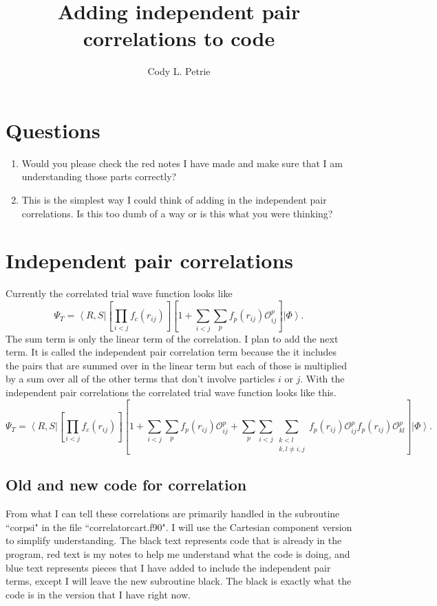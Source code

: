 \documentclass[12pt]{extarticle}
\title{Adding independent pair correlations to code}
\author{Cody L. Petrie}
\newcommand{\Oijp}{\mathcal{O}^p_{ij}}
\newcommand{\Oklp}{\mathcal{O}^p_{kl}}
\newcommand{\ket}[1]{\left| #1 \right>}
\newcommand{\bra}[1]{\left< #1 \right|}
\begin{document}
\maketitle

\section{Questions}
\begin{enumerate}
  \item{Would you please check the red notes I have made and make sure that I am understanding those parts correctly?}
  \item{This is the simplest way I could think of adding in the independent pair correlations. Is this too dumb of a way or is this what you were thinking?}
\end{enumerate}

\section{Independent pair correlations}
Currently the correlated trial wave function looks like
\begin{equation}
  \Psi_T = \bra{R,S} \left[ \prod_{i<j}f_c(r_{ij}) \right] \left[ 1 + \sum_{i<j}\sum_p f_p(r_{ij}) \Oijp \right] \ket{\Phi}.
\end{equation}
The sum term is only the linear term of the correlation. I plan to add the next term. It is called the independent pair correlation term because the it includes the pairs that are summed over in the linear term but each of those is multiplied by a sum over all of the other terms that don't involve particles $i$ or $j$. With the independent pair correlations the correlated trial wave function looks like this.
\begin{equation}
  \Psi_T = \bra{R,S} \left[ \prod_{i<j}f_c(r_{ij}) \right] \left[ 1 + \sum_{i<j}\sum_p f_p(r_{ij}) \Oijp + \sum_p\sum_{i<j}\sum\limits_{\substack{k<l\\k,l \ne i,j}} f_p(r_{ij})\Oijp f_p(r_{ij})\Oklp \right] \ket{\Phi}.
\end{equation}

\subsection{Old and new code for correlation}
From what I can tell these correlations are primarily handled in the subroutine ``corpsi" in the file ``correlatorcart.f90". I will use the Cartesian component version to simplify understanding. The black text represents code that is already in the program, red text is my notes to help me understand what the code is doing, and blue text represents pieces that I have added to include the independent pair terms, except I will leave the new subroutine black. The black is exactly what the code is in the version that I have right now.
\end{document}
